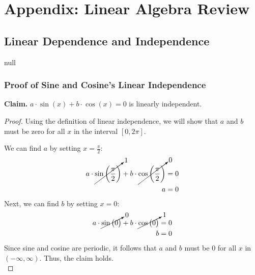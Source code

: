 \chapter{Appendix: Linear Algebra Review}
\label{app:linalg}
\section{Linear Dependence and Independence}
null
\subsection{Proof of Sine and Cosine's Linear Independence}
\vspace{0.5cm}
\textbf{Claim. } $a \cdot \sin(x) + b \cdot \cos(x) = 0$ is linearly independent.
    \begin{proof}
        Using the definition of linear independence, we will show that $a$ and $b$ must be zero for all $x$ in the interval $[0, 2\pi]$.
        
        \vspace{0.5cm}
        \noindent
        We can find $a$ by setting $x = \frac{\pi}{2}$:
        \begin{align*}
            a \cdot \cancelto{1}{\sin \bigg(\frac{\pi}{2} \bigg)}
            + b \cdot \cancelto{0}{\cos \bigg(\frac{\pi}{2} \bigg)} &= 0\\
            a &= 0
        \end{align*}
        Next, we can find $b$ by setting $x = 0$:
        \begin{align*}
            a \cdot \cancelto{0}{\sin \big(0 \big)}
            + b \cdot \cancelto{1}{\cos \big(0 \big)} &= 0\\
            b &= 0
        \end{align*}
        \noindent
        Since sine and cosine are periodic, it follows that $a$ and $b$ must be $0$ for all $x$ in $(-\infty, \infty)$.  Thus, the claim holds.\\
    \end{proof}
